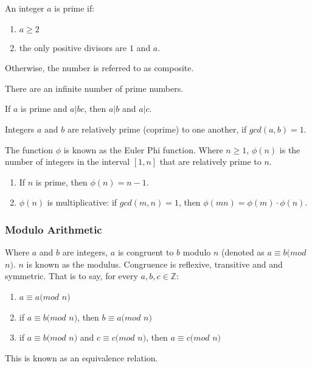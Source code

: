 \begin{mathdef}
	An integer $a$ is prime if:
	\begin{enumerate}
		\item $a\ge2$
		\item the only positive divisors are $1$ and $a$.
	\end{enumerate}
	Otherwise, the number is referred to as composite.
\end{mathdef}

\begin{mathfact}
	There are an infinite number of prime numbers.
\end{mathfact}

\begin{mathdef}
	If $a$ is prime and $a|bc$, then $a|b$ and $a|c$.
\end{mathdef}

\begin{mathdef}
	Integers $a$ and $b$ are relatively prime (coprime) to one another, if $gcd(a,b)=1$.
\end{mathdef}

\begin{mathdef}
	The function $\phi$ is known as the Euler Phi function. Where $n\ge1$, $\phi(n)$ is the number of integers in the interval $[1,n]$ that are relatively prime to $n$.
	\begin{enumerate}
		\item If $n$ is prime, then $\phi(n) = n - 1$.
		\item $\phi(n)$ is multiplicative: if $gcd(m,n) = 1$, then $\phi(mn) = \phi(m) \cdot  \phi(n)$.
	\end{enumerate}
\end{mathdef}

\subsubsection{Modulo Arithmetic}

\begin{mathdef}
	Where $a$ and $b$ are integers, $a$ is congruent to $b$ modulo $n$ (denoted as $a \equiv b (mod$ $n)$. $n$ is known as the modulus. Congruence is reflexive, transitive and and symmetric. That is to say, for every $a,b,c \in \mathbb{Z}$:
	\begin{enumerate}
		\item $a \equiv a (mod$ $n)$
		\item if $a \equiv b (mod$ $n)$, then $b \equiv a (mod$ $n)$
		\item if $a \equiv b (mod$ $n)$ and $c \equiv c (mod$ $n)$, then $a \equiv c (mod$ $n)$
	\end{enumerate}
	This is known as an equivalence relation.
\end{mathdef}

